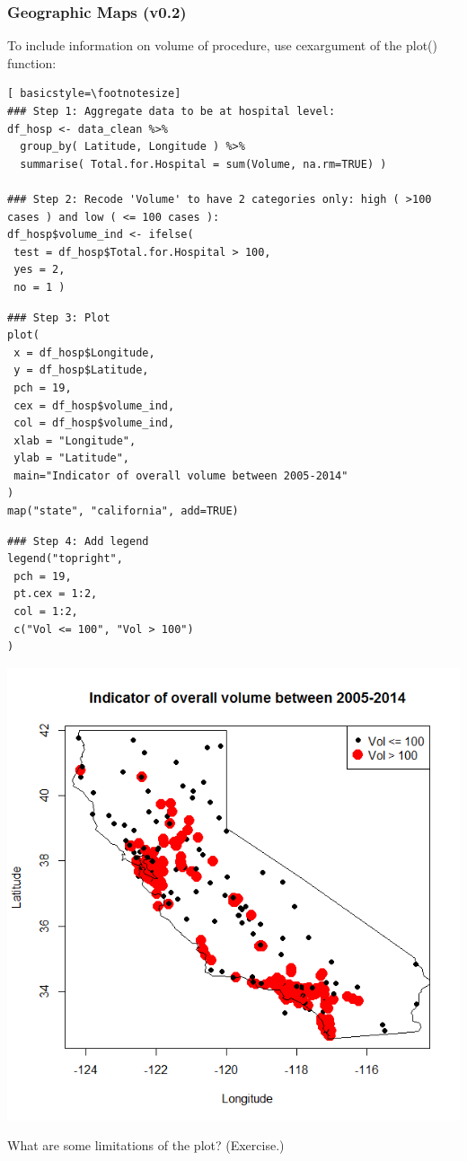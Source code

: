 \begin{frame}
\frametitle{Geographic Maps (v0.2)}

To include information on volume of procedure, use \ttfamily cex\normalfont argument of the \ttfamily plot() \normalfont function:

\begin{lstlisting}[ basicstyle=\footnotesize]
### Step 1: Aggregate data to be at hospital level:
df_hosp <- data_clean %>%
  group_by( Latitude, Longitude ) %>%
  summarise( Total.for.Hospital = sum(Volume, na.rm=TRUE) )
	
### Step 2: Recode 'Volume' to have 2 categories only: high ( >100 cases ) and low ( <= 100 cases ):
df_hosp$volume_ind <- ifelse( 
 test = df_hosp$Total.for.Hospital > 100, 
 yes = 2, 
 no = 1 )
\end{lstlisting}

\newpage
\begin{lstlisting}
### Step 3: Plot
plot(
 x = df_hosp$Longitude, 
 y = df_hosp$Latitude, 
 pch = 19, 
 cex = df_hosp$volume_ind, 
 col = df_hosp$volume_ind, 
 xlab = "Longitude", 
 ylab = "Latitude",
 main="Indicator of overall volume between 2005-2014"
)
map("state", "california", add=TRUE)
\end{lstlisting}

\begin{lstlisting}
### Step 4: Add legend
legend("topright", 
 pch = 19, 
 pt.cex = 1:2,
 col = 1:2, 
 c("Vol <= 100", "Vol > 100") 
)
\end{lstlisting}

\newpage
       \begin{center}
		\includegraphics[scale=0.25]{images/geoplot_v1.png}
	\end{center}
What are some limitations of the plot? (Exercise.)
\end{frame}

